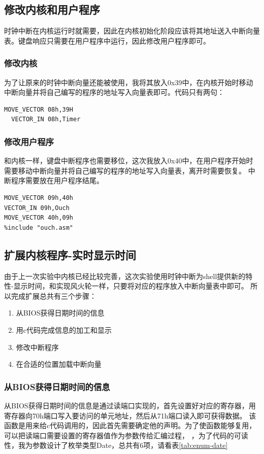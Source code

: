 \documentclass[a4paper, 11pt]{article} %
\begin{document}
\subsection{修改内核和用户程序}

时钟中断在内核运行时就需要，因此在内核初始化阶段应该将其地址送入中断向量表。键盘响应只需要在用户程序中运行，因此修改用户程序即可。

\subsubsection{修改内核}

为了让原来的时钟中断向量还能被使用，我将其放入0x39中，在内核开始时移动中断向量并将自己编写的程序的地址写入向量表即可。代码只有两句：
\begin{lstlisting}[language={[x86masm]Assembler},label=kernelChange,caption=内核程序更改]
  MOVE_VECTOR 08h,39H
  VECTOR_IN 08h,Timer
\end{lstlisting}
\subsubsection{修改用户程序}

和内核一样，键盘中断程序也需要移位，这次我放入0x40中，在用户程序开始时需要移动中断向量并将自己编写的程序的地址写入向量表，离开时需要恢复。
中断程序需要放在用户程序结尾。

\begin{lstlisting}[language={[x86masm]Assembler},label=userChange,caption=用户程序更改]
MOVE_VECTOR 09h,40h
VECTOR_IN 09h,Ouch
MOVE_VECTOR 40h,09h
%include "ouch.asm"
\end{lstlisting}

\subsection{扩展内核程序-实时显示时间}
由于上一次实验中内核已经比较完善，这次实验使用时钟中断为shell提供新的特性-显示时间，和实现风火轮一样，只要将对应的程序放入中断向量表中即可。
所以完成扩展总共有三个步骤：
\begin{enumerate}
  \item 从BIOS获得日期时间的信息
  \item 用c代码完成信息的加工和显示
  \item 修改中断程序
  \item 在合适的位置加载中断向量
\end{enumerate}

\subsubsection{从BIOS获得日期时间的信息}
从BIOS获得日期时间的信息是通过读端口实现的，首先设置好对应的寄存器，用寄存器向70h端口写入要访问的单元地址，然后从71h端口读入即可获得数据。
该函数是用来给c代码调用的，因此首先需要确定他的声明。为了使函数能够复用，可以把读端口需要设置的寄存器值作为参数传给汇编过程，
，为了代码的可读性，我为参数设计了枚举类型Date，总共有6项，请看表\ref{tab:enum-date}
\FloatBarrier
\end{document}
